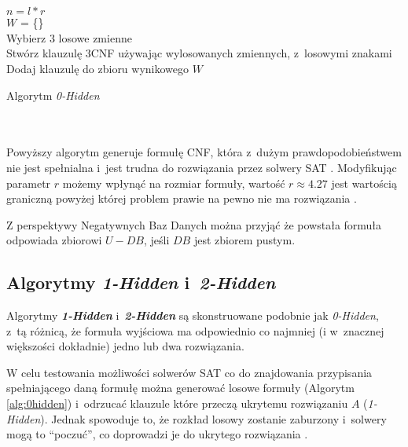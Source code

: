  ~\\\\
 \begin{algorithm}[H]
     \SetAlgoLined
     
     $n = l * r$\\
     $W$ = \{\}\\
     {
         Wybierz 3 losowe zmienne\\
         Stwórz klauzulę 3CNF używając wylosowanych zmiennych, z~losowymi znakami\\
         Dodaj klauzulę do zbioru wynikowego $W$
     } 
     
     \caption{Algorytm \textit{0-Hidden}}
     \label{alg:0hidden}
 \end{algorithm}
 ~\\\\
Powyższy algorytm generuje formułę CNF, która z~dużym prawdopodobieństwem nie jest spełnialna i~jest trudna do rozwiązania przez solwery SAT \cite{GeneratingHardFormulasByHidingSolutionsDeceptively, HidingSatisfyingAssignmentsTwoAreBetterThanOne}.
Modyfikując parametr $r$ możemy wpłynąć na rozmiar formuły, wartość $r \approx 4.27$ jest wartością graniczną powyżej której problem prawie na pewno nie ma rozwiązania \cite{GeneratingHardFormulasByHidingSolutionsDeceptively}.

Z perspektywy Negatywnych Baz Danych można przyjąć że powstała formuła odpowiada zbiorowi $U - DB$, jeśli $DB$ jest zbiorem pustym.

\subsection{Algorytmy \textit{1-Hidden} i~\textit{2-Hidden}}
\label{sec:12hidden}
Algorytmy \textit{\textbf{1-Hidden}} i~\textit{\textbf{2-Hidden}} są skonstruowane podobnie jak \textit{0-Hidden}, z~tą różnicą, że formuła wyjściowa ma odpowiednio co najmniej (i w~znacznej większości dokładnie) jedno lub dwa rozwiązania.  
 
W celu testowania możliwości solwerów SAT co do znajdowania przypisania spełniającego daną formułę można generować losowe formuły (Algorytm \ref{alg:0hidden}) i~odrzucać klauzule które
przeczą ukrytemu rozwiązaniu $A$ (\textit{1-Hidden}). Jednak spowoduje to, że rozkład losowy zostanie zaburzony i~solwery mogą to \enquote{poczuć}, co doprowadzi je do ukrytego rozwiązania \cite{HidingSatisfyingAssignmentsTwoAreBetterThanOne}.
    
